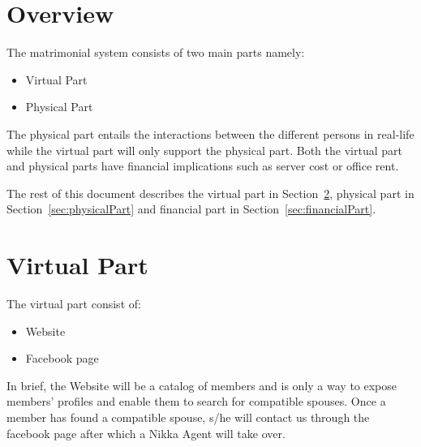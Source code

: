 \documentclass[12pt]{article}
\newcommand{\secref}[1]{Section~\ref{sec:#1}}
\begin{document}
\maketitle

\section{Overview}

The matrimonial system consists of two main parts namely:

\begin{itemize}
	\item Virtual Part
	\item Physical Part
\end{itemize}

The physical part entails the interactions between the different persons in real-life while the virtual part will only support the physical part. Both the virtual part and physical parts have financial implications such as server cost or office rent. 

The rest of this document describes the virtual part in \secref{virtualPart}, physical part in \secref{physicalPart} and financial part in \secref{financialPart}.



\section{Virtual Part}\label{sec:virtualPart}

The virtual part consist of:
\begin{itemize}
	\item Website
	\item Facebook page
\end{itemize}

In brief, the Website will be a catalog of members and is only a way to expose members' profiles and enable them to search for compatible spouses. Once a member has found a compatible spouse, s/he will contact us through the facebook page after which a Nikka Agent will take over.
\end{document}
